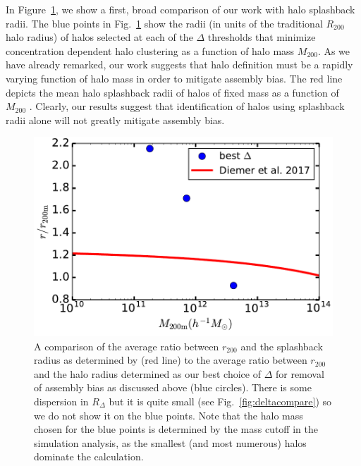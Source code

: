 \documentclass[usenatbib,fleqn]{mnras}
\begin{document}
In Figure~\ref{fig:splashback_compare}, we show a first, broad comparison of our work with halo splashback radii. The blue points in Fig.~\ref{fig:splashback_compare} show the radii (in units of the traditional $R_{200}$ halo radius) of halos selected at each of the $\Delta$ thresholds that minimize concentration dependent halo clustering as a function of halo mass $M_{200}$. As we have already remarked, our work suggests that halo definition must be a rapidly varying function of halo mass in order to mitigate assembly bias. The red line depicts the mean halo splashback radii of halos of fixed mass as a function of $M_{200}$ \citep{diemer_etal17}. Clearly, our results suggest that identification of halos using splashback radii alone will not greatly mitigate assembly bias. 

\begin{figure}
	\centering
	\includegraphics[width=\columnwidth]{test_splashback.pdf}
	\caption{A comparison of the average ratio between $r_{200}$ and the splashback radius as determined by \citet{diemer_etal17} (red line) to the average ratio between $r_{200}$ and the halo radius determined as our best choice of $\Delta$ for removal of assembly bias as discussed above (blue circles). There is some dispersion in $R_{\Delta}$ but it is quite small (see Fig.~\ref{fig:deltacompare}) so we do not show it on the blue points. Note that the halo mass chosen for the blue points is determined by the mass cutoff in the simulation analysis, as the smallest (and most numerous) halos dominate the calculation. 
}
	\label{fig:splashback_compare}
\end{figure}
\end{document}
